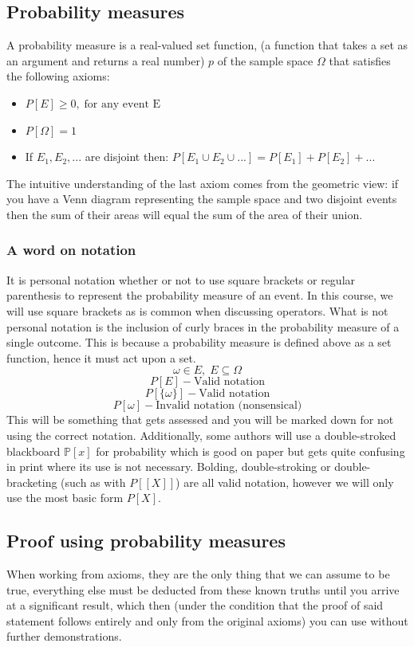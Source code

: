\documentclass[12pt]{article}
\begin{document}
\subsection*{Probability measures}
A probability measure is a real-valued set function, (a function that takes a set as an argument and returns a real number) \(p\) of the sample space \(\Omega\) that satisfies the following axioms:
\begin{itemize}
    \item \(P[E]\geq0,\;\text{for any event E}\) 
    \item \(P[\Omega]=1\)
    \item If \(E_1,E_2,...\) are disjoint then: \(P[E_1\cup E_2\cup...]=P[E_1]+P[E_2]+...\)
\end{itemize}
The intuitive understanding of the last axiom comes from the geometric view: if you have a Venn diagram representing the sample space and two disjoint events then the sum of their areas will equal the sum of the area of their union.
\subsubsection*{A word on notation}
It is personal notation whether or not to use square brackets or regular parenthesis to represent the probability measure of an event. In this course, we will use square brackets as is common when discussing operators. What is not personal notation is the inclusion of curly braces in the probability measure of a single outcome. This is because a probability measure is defined above as a set function, hence it must act upon a set.
\[\omega\in E,\;E\subseteq\Omega\]
\[P[E] -\text{Valid notation}\]
\[P[\{\omega\}] -\text{Valid notation}\]
\[P[\omega] -\text{Invalid notation (nonsensical)}\]
This will be something that gets assessed and you will be marked down for not using the correct notation. Additionally, some authors will use a double-stroked blackboard \(\mathbb{P}[x]\) for probability which is good on paper but gets quite confusing in print where its use is not necessary. Bolding, double-stroking or double-bracketing (such as with \(P[[X]]\)) are all valid notation, however we will only use the most basic form \(P[X]\).
\subsection*{Proof using probability measures}
When working from axioms, they are the only thing that we can assume to be true, everything else must be deducted from these known truths until you arrive at a significant result, which then (under the condition that the proof of said statement follows entirely and only from the original axioms) you can use without further demonstrations.
\end{document}
